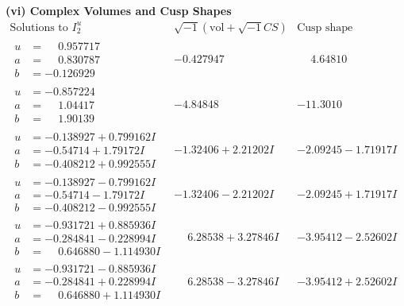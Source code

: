 \documentclass[1p]{elsarticle_modified}
\theoremstyle{definition}
\newcommand{\I}{\sqrt{-1}}
\begin{document}
\newpage\flushleft \textbf{(vi) Complex Volumes and Cusp Shapes}
$$\begin{array}{c|c|c}  
\text{Solutions to }I^u_{2}& \I (\text{vol} + \sqrt{-1}CS) & \text{Cusp shape}\\
 \hline 
\begin{aligned}
u &= \phantom{-}0.957717\phantom{ +0.000000I} \\
a &= \phantom{-}0.830787\phantom{ +0.000000I} \\
b &= -0.126929\phantom{ +0.000000I}\end{aligned}
 & -0.427947\phantom{ +0.000000I} & \phantom{-}4.64810\phantom{ +0.000000I} \\ \hline\begin{aligned}
u &= -0.857224\phantom{ +0.000000I} \\
a &= \phantom{-}1.04417\phantom{ +0.000000I} \\
b &= \phantom{-}1.90139\phantom{ +0.000000I}\end{aligned}
 & -4.84848\phantom{ +0.000000I} & -11.3010\phantom{ +0.000000I} \\ \hline\begin{aligned}
u &= -0.138927 + 0.799162 I \\
a &= -0.54714 + 1.79172 I \\
b &= -0.408212 + 0.992555 I\end{aligned}
 & -1.32406 + 2.21202 I & -2.09245 - 1.71917 I \\ \hline\begin{aligned}
u &= -0.138927 - 0.799162 I \\
a &= -0.54714 - 1.79172 I \\
b &= -0.408212 - 0.992555 I\end{aligned}
 & -1.32406 - 2.21202 I & -2.09245 + 1.71917 I \\ \hline\begin{aligned}
u &= -0.931721 + 0.885936 I \\
a &= -0.284841 - 0.228994 I \\
b &= \phantom{-}0.646880 - 1.114930 I\end{aligned}
 & \phantom{-}6.28538 + 3.27846 I & -3.95412 - 2.52602 I \\ \hline\begin{aligned}
u &= -0.931721 - 0.885936 I \\
a &= -0.284841 + 0.228994 I \\
b &= \phantom{-}0.646880 + 1.114930 I\end{aligned}
 & \phantom{-}6.28538 - 3.27846 I & -3.95412 + 2.52602 I \\ \hline\begin{aligned}

\end{aligned}
\end{array}$$
\end{document}
